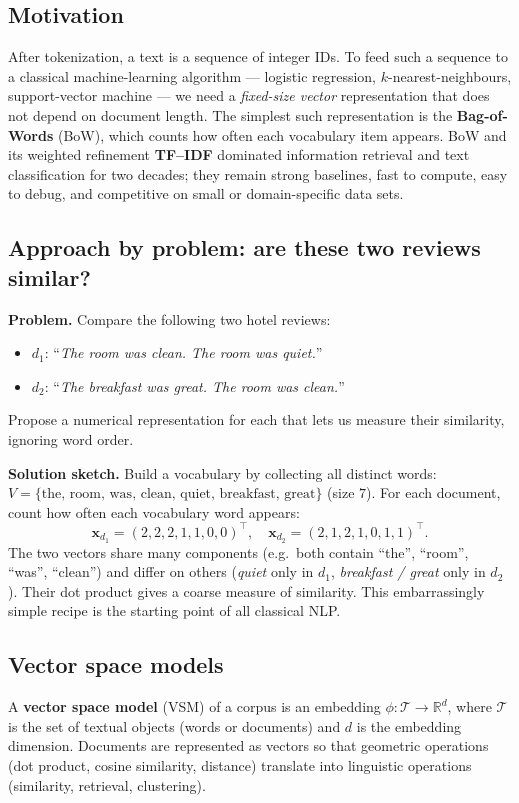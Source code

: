 \subsection{Motivation}
After tokenization, a text is a sequence of integer IDs. To feed such a sequence to a classical machine-learning algorithm --- logistic regression, $k$-nearest-neighbours, support-vector machine --- we need a \emph{fixed-size vector} representation that does not depend on document length. The simplest such representation is the \textbf{Bag-of-Words} (BoW), which counts how often each vocabulary item appears. BoW and its weighted refinement \textbf{TF--IDF} dominated information retrieval and text classification for two decades; they remain strong baselines, fast to compute, easy to debug, and competitive on small or domain-specific data sets.

\subsection{Approach by problem: are these two reviews similar?}
\textbf{Problem.} Compare the following two hotel reviews:
\begin{itemize}
    \item $d_1$: ``\emph{The room was clean. The room was quiet.}''
    \item $d_2$: ``\emph{The breakfast was great. The room was clean.}''
\end{itemize}
Propose a numerical representation for each that lets us measure their similarity, ignoring word order.

\textbf{Solution sketch.} Build a vocabulary by collecting all distinct words: $V = \{\text{the, room, was, clean, quiet, breakfast, great}\}$ (size $7$). For each document, count how often each vocabulary word appears:
\[ \mathbf{x}_{d_1} = (2, 2, 2, 1, 1, 0, 0)^\top, \quad \mathbf{x}_{d_2} = (2, 1, 2, 1, 0, 1, 1)^\top. \]
The two vectors share many components (e.g.\ both contain ``the'', ``room'', ``was'', ``clean'') and differ on others (\emph{quiet} only in $d_1$, \emph{breakfast / great} only in $d_2$). Their dot product gives a coarse measure of similarity. This embarrassingly simple recipe is the starting point of all classical NLP.

\subsection{Vector space models}

\begin{definition}
A \textbf{vector space model} (VSM) of a corpus is an embedding $\phi : \mathcal{T} \to \mathbb{R}^d$, where $\mathcal{T}$ is the set of textual objects (words or documents) and $d$ is the embedding dimension. Documents are represented as vectors so that geometric operations (dot product, cosine similarity, distance) translate into linguistic operations (similarity, retrieval, clustering).
\end{definition}

